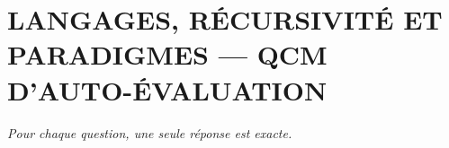 
\section*{\textcolor{chapcolor}{\MakeUppercase{Langages, récursivité et paradigmes — QCM d'auto-évaluation}}}

\begin{center}
\textit{Pour chaque question, une seule réponse est exacte.}
\end{center}

